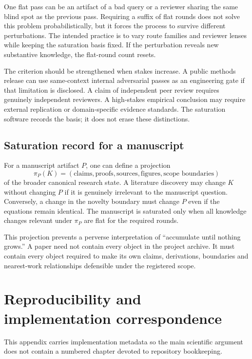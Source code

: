 One flat pass can be an artifact of a bad query or a reviewer sharing the same blind spot as the previous pass. Requiring a suffix of flat rounds does not solve this problem probabilistically, but it forces the process to survive different perturbations. The intended practice is to vary route families and reviewer lenses while keeping the saturation basis fixed. If the perturbation reveals new substantive knowledge, the flat-round count resets.

The criterion should be strengthened when stakes increase. A public methods release can use same-context internal adversarial passes as an engineering gate if that limitation is disclosed. A claim of independent peer review requires genuinely independent reviewers. A high-stakes empirical conclusion may require external replication or domain-specific evidence standards. The saturation software records the basis; it does not erase these distinctions.

\subsection{Saturation record for a manuscript}

For a manuscript artifact \(P\), one can define a projection
\[
\pi_P(K)=
(\text{claims},\text{proofs},\text{sources},\text{figures},\text{scope boundaries})
\]
of the broader canonical research state. A literature discovery may change \(K\) without changing \(P\) if it is genuinely irrelevant to the manuscript question. Conversely, a change in the novelty boundary must change \(P\) even if the equations remain identical. The manuscript is saturated only when all knowledge changes relevant under \(\pi_P\) are flat for the required rounds.

This projection prevents a perverse interpretation of ``accumulate until nothing grows.'' A paper need not contain every object in the project archive. It must contain every object required to make its own claims, derivations, boundaries and nearest-work relationships defensible under the registered scope.

\section{Reproducibility and implementation correspondence}
\label{app:reproducibility}

This appendix carries implementation metadata so the main scientific argument does not contain a numbered chapter devoted to repository bookkeeping.

